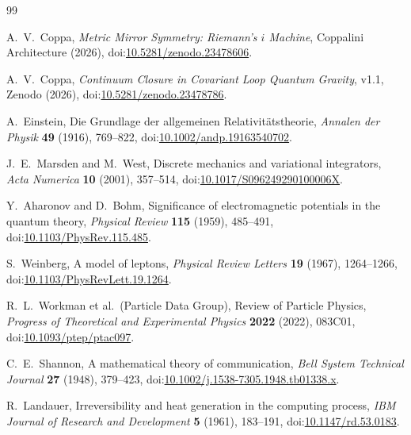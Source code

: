 \clearpage
\begin{thebibliography}{99}

A.~V.~Coppa,
\newblock \emph{Metric Mirror Symmetry: Riemann's $i$ Machine},
\newblock Coppalini Architecture (2026),
\newblock doi:\href{https://doi.org/10.5281/zenodo.23478606}{10.5281/zenodo.23478606}.

A.~V.~Coppa,
\newblock \emph{Continuum Closure in Covariant Loop Quantum Gravity}, v1.1,
\newblock Zenodo (2026),
\newblock doi:\href{https://doi.org/10.5281/zenodo.23478786}{10.5281/zenodo.23478786}.

A.~Einstein,
\newblock Die Grundlage der allgemeinen Relativit\"atstheorie,
\newblock \emph{Annalen der Physik} \textbf{49} (1916), 769--822,
\newblock doi:\href{https://doi.org/10.1002/andp.19163540702}{10.1002/andp.19163540702}.

J.~E.~Marsden and M.~West,
\newblock Discrete mechanics and variational integrators,
\newblock \emph{Acta Numerica} \textbf{10} (2001), 357--514,
\newblock doi:\href{https://doi.org/10.1017/S096249290100006X}{10.1017/S096249290100006X}.

Y.~Aharonov and D.~Bohm,
\newblock Significance of electromagnetic potentials in the quantum theory,
\newblock \emph{Physical Review} \textbf{115} (1959), 485--491,
\newblock doi:\href{https://doi.org/10.1103/PhysRev.115.485}{10.1103/PhysRev.115.485}.

S.~Weinberg,
\newblock A model of leptons,
\newblock \emph{Physical Review Letters} \textbf{19} (1967), 1264--1266,
\newblock doi:\href{https://doi.org/10.1103/PhysRevLett.19.1264}{10.1103/PhysRevLett.19.1264}.

R.~L.~Workman et al.\ (Particle Data Group),
\newblock Review of Particle Physics,
\newblock \emph{Progress of Theoretical and Experimental Physics} \textbf{2022}
(2022), 083C01,
\newblock doi:\href{https://doi.org/10.1093/ptep/ptac097}{10.1093/ptep/ptac097}.

C.~E.~Shannon,
\newblock A mathematical theory of communication,
\newblock \emph{Bell System Technical Journal} \textbf{27} (1948), 379--423,
\newblock doi:\href{https://doi.org/10.1002/j.1538-7305.1948.tb01338.x}{10.1002/j.1538-7305.1948.tb01338.x}.

R.~Landauer,
\newblock Irreversibility and heat generation in the computing process,
\newblock \emph{IBM Journal of Research and Development} \textbf{5} (1961),
183--191,
\newblock doi:\href{https://doi.org/10.1147/rd.53.0183}{10.1147/rd.53.0183}.


\end{thebibliography}
